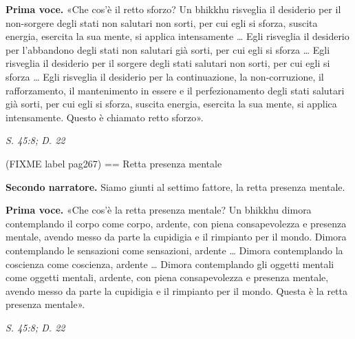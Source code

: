 \textbf{Prima voce.} «Che cos’è il retto sforzo? Un bhikkhu risveglia il
desiderio per il non-sorgere degli stati non salutari non sorti, per cui
egli si sforza, suscita energia, esercita la sua mente, si applica
intensamente … Egli risveglia il desiderio per l’abbandono degli stati
non salutari già sorti, per cui egli si sforza … Egli risveglia il
desiderio per il sorgere degli stati salutari non sorti, per cui egli si
sforza … Egli risveglia il desiderio per la continuazione, la
non-corruzione, il rafforzamento, il mantenimento in essere e il
perfezionamento degli stati salutari già sorti, per cui egli si sforza,
suscita energia, esercita la sua mente, si applica intensamente. Questo
è chiamato retto sforzo».


\emph{S. 45:8; D. 22}


(FIXME label pag267)
== Retta presenza mentale


\textbf{Secondo narratore.} Siamo giunti al settimo fattore, la retta presenza
mentale.


\textbf{Prima voce.} «Che cos’è la retta presenza mentale? Un bhikkhu dimora
contemplando il corpo come corpo, ardente, con piena consapevolezza e
presenza mentale, avendo messo da parte la cupidigia e il rimpianto per
il mondo. Dimora contemplando le sensazioni come sensazioni, ardente …
Dimora contemplando la coscienza come coscienza, ardente … Dimora
contemplando gli oggetti mentali come oggetti mentali, ardente, con
piena consapevolezza e presenza mentale, avendo messo da parte la
cupidigia e il rimpianto per il mondo. Questa è la retta presenza
mentale».


\emph{S. 45:8; D. 22}


